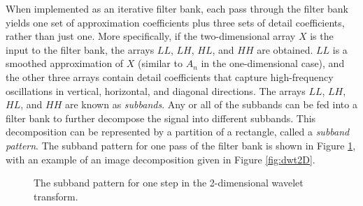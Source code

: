 When implemented as an iterative filter bank, each pass through the filter bank yields one set of approximation coefficients plus three sets of detail coefficients, rather than just one.
More specifically, if the two-dimensional array $X$ is the input to the filter bank, the arrays $LL$, $LH$, $HL$, and $HH$ are obtained.
$LL$ is a smoothed approximation of $X$ (similar to $A_n$ in the one-dimensional case), and the other three arrays contain detail coefficients that capture high-frequency oscillations in
vertical, horizontal, and diagonal directions.
The arrays $LL$, $LH$, $HL$, and $HH$ are known as \emph{subbands}.
Any or all of the subbands can be fed into a filter bank to further decompose the signal into different subbands.
This decomposition can be represented by a partition of a rectangle, called a \emph{subband pattern}.
The subband pattern for one pass of the filter bank is shown in Figure \ref{fig:2dsubbands}, with an example of an image decomposition given in Figure \ref{fig:dwt2D}.

\begin{figure}[H]
\caption{The subband pattern for one step in the 2-dimensional wavelet transform.}
\label{fig:2dsubbands}
\end{figure}

